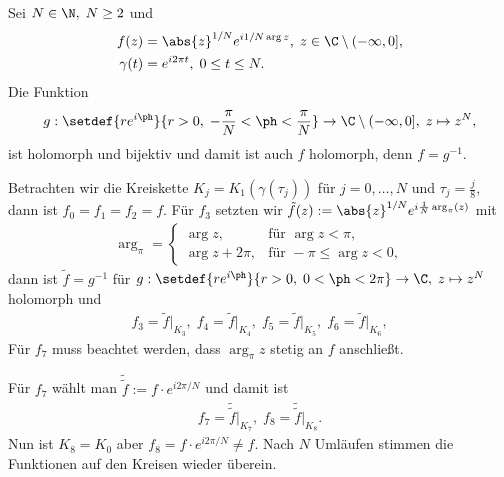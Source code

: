 \begin{bsp}
\label{bsp:2.71}
Sei $N\in\N,\;N\ge 2$ und
\begin{align*}
f(z) &= \abs{z}^{1/N}e^{i1/N\arg z},\;z\in\C\setminus(-\infty,0],\\
\gamma(t) &= e^{i2\pi t},\;0\le t\le N.
\end{align*}
Die Funktion
\begin{align*}
g: \setdef{re^{i\ph}}{r > 0,\;-\frac{\pi}{N}<\ph<\frac{\pi}{N}} \to
\C\setminus(-\infty,0],\;z\mapsto z^N,
\end{align*}
ist holomorph und bijektiv und damit ist auch $f$ holomorph, denn $f = g^{-1}$.

Betrachten wir die Kreiskette $K_j = K_1\left(\gamma(\tau_j)\right)$ für
$j=0,\ldots,N$ und $\tau_j = \frac{j}{8}$, dann ist $f_0 = f_1 = f_2 = f$.
Für $f_3$ setzten wir $\tilde{f}(z) :=
\abs{z}^{1/N}e^{i\frac{1}{N}\arg_\pi(z)}$ mit
\begin{align*}
\arg_\pi = \begin{cases}
           \arg z, &\text{für } \arg z <\pi,\\
           \arg z + 2\pi, &\text{für } -\pi \le \arg z < 0,
           \end{cases}
\end{align*}
dann ist $\tilde{f} = g^{-1}$ für $g: \setdef{re^{i\ph}}{r > 0,\; 0<\ph<2\pi}\to
\C,\; z\mapsto z^N$ holomorph und
\begin{align*}
f_3 = \tilde{f}\big|_{K_3},\;f_4 = \tilde{f}\big|_{K_4},\;f_5 =
\tilde{f}\big|_{K_5},\;f_6 = \tilde{f}\big|_{K_6},
\end{align*}
Für $f_7$ muss beachtet werden, dass $\arg_\pi z$ stetig an $f$ anschließt.

Für $f_7$ wählt man $\tilde{\tilde{f}}:= f\cdot e^{i2\pi/N}$ und damit ist
\begin{align*}
f_7 = \tilde{\tilde{f}}\big|_{K_7},\;f_8 = \tilde{\tilde{f}}\big|_{K_8}.
\end{align*}
Nun ist $K_8 = K_0$ aber $f_8 = f\cdot e^{i2\pi/N}\neq f$. Nach $N$ Umläufen
stimmen die Funktionen auf den Kreisen wieder überein.\bsphere
\end{bsp}

